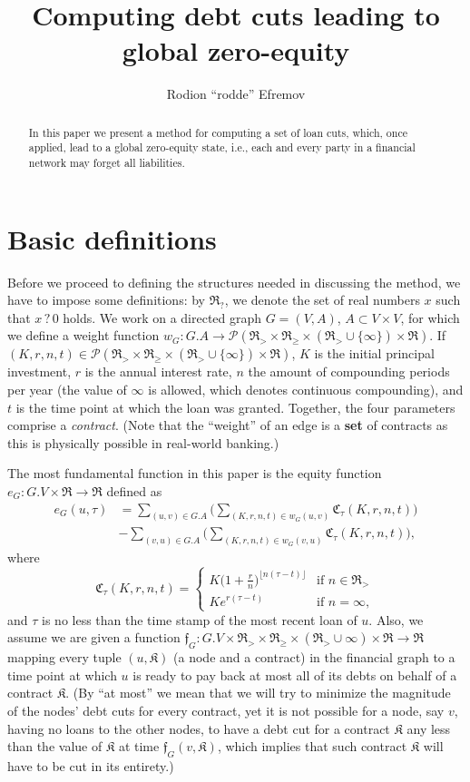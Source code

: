\documentclass[10pt]{article}
\title{Computing debt cuts leading to global zero-equity}
\author{Rodion ``rodde'' Efremov}
\newcommand{\RR}{\mathfrak{R}}
\newcommand{\KK}{\mathfrak{K}}
\newcommand{\CC}{\mathfrak{C}}
\newcommand{\ff}{\mathfrak{f}}
\begin{document}
  \maketitle
  
  \begin{abstract}
  In this paper we present a method for computing a set of loan cuts, which, once applied, lead to a global zero-equity state, i.e., each and every party in a financial network may forget all liabilities. 
  \end{abstract}
  
  \section{Basic definitions}
  Before we proceed to defining the structures needed in discussing the method, we have to impose some definitions: by $\RR_?$, we denote the set of real numbers $x$ such that $x \, ? \, 0$ holds. We work on a directed graph $G=(V,A)$, $A \subset V \times V$, for which we define a weight function $w_G \colon G.A \to \mathcal{P}(\RR_> \times \RR_{\geq} \times (\RR_> \cup \{\infty\}) \times \RR)$. If $(K, r, n, t) \in \mathcal{P}(\RR_> \times \RR_{\geq} \times (\RR_> \cup \{\infty\}) \times \RR)$, $K$ is the initial principal investment, $r$ is the annual interest rate, $n$ the amount of compounding periods per year (the value of $\infty$ is allowed, which denotes continuous compounding), and $t$ is the time point at which the loan was granted. Together, the four parameters comprise a \textit{contract}. (Note that the ``weight'' of an edge is a \textbf{set} of contracts as this is physically possible in real-world banking.) 

The most fundamental function in this paper is the equity function $e_G \colon G.V \times \RR \to \RR$ defined as 
\begin{align*}
e_G(u, \tau) &= \sum_{(u, v) \in G.A} \Bigg( \sum_{(K, r, n, t) \in w_G(u, v)} \CC_{\tau}(K, r, n, t) \Bigg) \\
&- \sum_{(v, u) \in G.A} \Bigg( \sum_{(K, r, n, t) \in w_G(v,u)} \CC_{\tau}(K, r, n, t) \Bigg),
\end{align*}
where 
\[
\CC_{\tau}(K, r, n, t) = 
\begin{cases}
K\big( 1 + \frac{r}{n}\big)^{\lfloor n(\tau - t) \rfloor} & \mbox{if } n \in \mathfrak{R_>} \\
Ke^{r(\tau - t)} & \mbox{if } n = \infty,
\end{cases}
\]
and $\tau$ is no less than the time stamp of the most recent loan of $u$. Also, we assume we are given a function $\ff_G \colon G.V \times \RR_{>} \times \RR_{\geq} \times (\RR_{>} \cup \infty) \times \RR \to \RR$ mapping every tuple $(u, \KK)$ (a node and a contract) in the financial graph to a time point at which $u$ is ready to pay back at most all of its debts on behalf of a contract $\KK$. (By ``at most'' we mean that we will try to minimize the magnitude of the nodes' debt cuts for every contract, yet it is not possible for a node, say $v$, having no loans to the other nodes, to have a debt cut for a contract $\KK$ any less than the value of $\KK$ at time $\ff_G(v, \KK)$, which implies that such contract $\KK$ will have to be cut in its entirety.)
\end{document}
